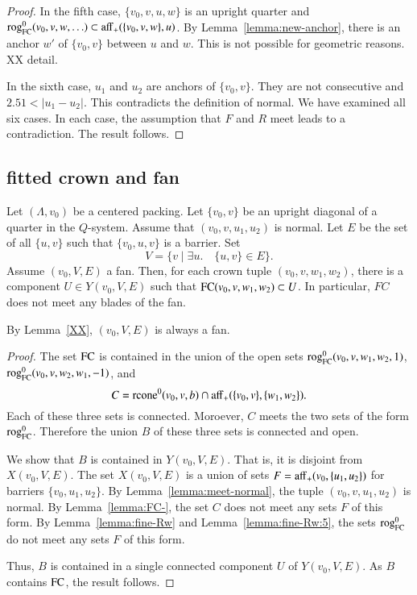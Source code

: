 \begin{proof}
In the fifth case, $\{v_0,v,u,w\}$ is an upright quarter and
${\operatorname{rog}}^0_{\text{FC}}(v_0,v,w,\ldots)\subset {\operatorname{aff}}_+(\{v_0,v,w\},u)$.  By Lemma~\ref{lemma:new-anchor},
there is an anchor $w'$ of $\{v_0,v\}$ between $u$ and $w$.
This is not possible for geometric reasons. XX detail.

In the sixth case, $u_1$ and $u_2$ are anchors of $\{v_0,v\}$.
They are not consecutive and $2.51 < |u_1-u_2|$.  This contradicts
the definition of normal.
We have examined all six cases.  In each case, the assumption
that $F$ and $R$ meet leads to a contradiction.  The result follows.
\end{proof}

\subsection{fitted crown and fan}

\begin{lemma}
Let $(\Lambda,v_0)$ be a centered packing.
Let $\{v_0,v\}$ be
an upright diagonal of a quarter in the $Q$-system.
Assume that $(v_0,v,u_1,u_2)$ is normal.
Let $E$ be the set of all $\{u,v\}$ such that $\{v_0,u,v\}$
is a barrier.  Set
   $$
   V = \{v \mid \exists u.\quad \{u,v\}\in E\}.
   $$
Assume $(v_0,V,E)$ a fan.  Then, for each crown tuple
$(v_0,v,w_1,w_2)$, there is a component $U\in Y(v_0,V,E)$ such
that ${\operatorname{FC}}(v_0,v,w_1,w_2)\subset U$.  In particular, $FC$ does
not meet any blades of the fan.
\end{lemma}

By Lemma~\ref{XX},  $(v_0,V,E)$ is always a fan.

\begin{proof}
The set ${\operatorname{FC}}$ is contained in the union of the open sets
${\operatorname{rog}}^0_{\text{FC}}(v_0,v,w_1,w_2,1)$, ${\operatorname{rog}}^0_{\text{FC}}(v_0,v,w_2,w_1,-1)$, and
  $$
  C={\operatorname{rcone}}^0(v_0,v,b)\cap {\operatorname{aff}}_+(\{v_0,v\},\{w_1,w_2\}).
  $$
Each of these three sets is connected.  Moroever, $C$ meets
the two sets of the form ${\operatorname{rog}}^0_{\text{FC}}$.  Therefore the union $B$ of
these three sets is connected and open.  

We show that $B$ is contained in $Y(v_0,V,E)$.  That is,
it is disjoint from $X(v_0,V,E)$.
The set $X(v_0,V,E)$ is a union of sets $F={\operatorname{aff}}_+(v_0,\{u_1,u_2\})$
for barriers $\{v_0,u_1,u_2\}$.  By Lemma~\ref{lemma:meet-normal},
the tuple $(v_0,v,u_1,u_2)$ is normal.
By Lemma~\ref{lemma:FC-}, the set $C$ does not meet any sets $F$
of this form.  By Lemma~\ref{lemma:fine-Rw} and Lemma~\ref{lemma:fine-Rw:5}, the sets ${\operatorname{rog}}^0_{\text{FC}}$ do not meet any sets $F$ of this form.

Thus, $B$ is contained in a single connected component $U$ of $Y(v_0,V,E)$.  As $B$ contains ${\operatorname{FC}}$, the result follows.
\end{proof}


